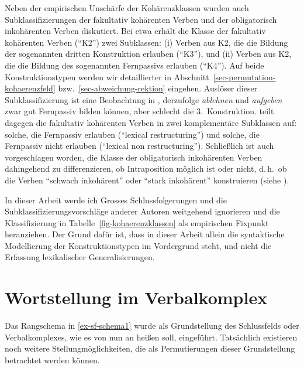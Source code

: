 Neben der empirischen Unschärfe der Kohärenzklassen wurden auch Subklassifizierungen der fakultativ kohärenten Verben und der obligatorisch inkohärenten Verben diskutiert. Bei \cite{Reis:Sternefeld:04} etwa erhält die Klasse der fakultativ kohärenten Verben ("`K2"') zwei Subklassen: (i) Verben aus K2, die die Bildung der sogenannten dritten Konstruktion erlauben ("`K3"'), und (ii) Verben aus K2, die die Bildung des sogenannten Fernpassivs erlauben ("`K4"'). Auf beide Konstruktionstypen werden wir detaillierter in Abschnitt~\ref{sec-permutation-kohaerenzfeld} bzw.\ \ref{sec-abweichung-rektion} eingehen. Auslöser dieser Subklassifizierung ist eine Beobachtung in \citet[318]{Woellstein:01}, derzufolge {\it ablehnen} und {\it aufgeben} zwar gut Fernpassiv bilden können, aber schlecht die 3.~Konstruktion. \cite{Wurmbrand:01} teilt dagegen die fakultativ kohärenten Verben in zwei komplementäre Subklassen auf: solche, die Fernpassiv erlauben ("`lexical restructuring"') und solche, die Fernpassiv nicht erlauben ("`lexical non restructuring"'). Schlie\ss lich ist auch vorgeschlagen worden, die Klasse der obligatorisch inkohärenten Verben dahingehend zu differenzieren, ob Intraposition möglich ist oder nicht, d.\,h.\ ob die Verben "`schwach inkohärent"' oder "`stark inkohärent"' konstruieren (siehe \citealt{Sternefeld:08}).\largerpage%

In dieser Arbeit werde ich Grosses Schlussfolgerungen und die Subklassifizierungsvorschläge anderer Autoren  weitgehend ignorieren und die Klassifizierung in Tabelle~\ref{fig-kohaerenzklassen} als empirischen Fixpunkt heranziehen. Der Grund dafür ist, dass in dieser Arbeit allein die syntaktische Modellierung der Konstruktionstypen im Vordergrund steht, und nicht die Erfassung lexikalischer Generalisierungen. 




\section{Wortstellung im Verbalkomplex} \label{sec-verbalkomplex}

Das Rangschema in \ref{ex-sf-schema1} wurde als Grundstellung des Schlussfelds oder Verbalkomplexes, wie es von nun an hei\ss en soll, eingeführt. Tatsächlich existieren noch weitere Stellungmöglichkeiten, die als Permutierungen dieser Grundstellung betrachtet werden können. 

